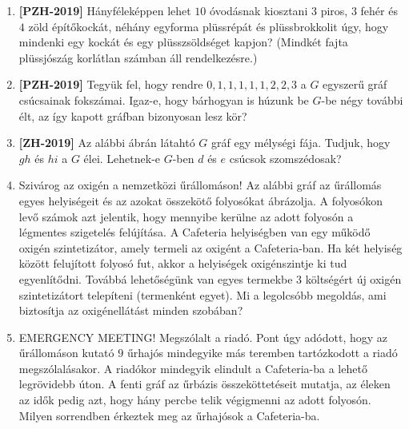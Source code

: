 \documentclass[a4paper,12pt]{article}
\begin{document}
        \noindent{}
        \noindent{}
        \begin{enumerate}

            \item \textbf{[PZH-2019]} Hányféleképpen lehet $10$ óvodásnak kiosztani $3$ piros, $3$ fehér és $4$ zöld építőkockát, néhány egyforma plüssrépát és plüssbrokkolit úgy, hogy mindenki egy kockát és egy plüsszsöldséget kapjon? (Mindkét fajta plüssjószág korlátlan számban áll rendelkezésre.)
            
            \item \textbf{[PZH-2019]} Tegyük fel, hogy rendre $0, 1, 1, 1, 1, 1, 2, 2, 3$ a $G$ egyszerű gráf csúcsainak fokszámai. Igaz-e, hogy bárhogyan is húzunk be $G$-be négy további élt, az így kapott gráfban bizonyosan lesz kör?
 
            \item \textbf{[ZH-2019]} Az alábbi ábrán látahtó $G$ gráf egy mélységi fája. Tudjuk, hogy $gh$ és $hi$ a $G$ élei. Lehetnek-e $G$-ben $d$ és $e$ csúcsok szomszédosak?
            \begin{figure}[!h]
                \centering
                
            \end{figure}

            \item Szivárog az oxigén a nemzetközi űrállomáson! Az alábbi gráf az űrállomás egyes helyiségeit és az azokat összekötő folyosókat ábrázolja. A folyosókon levő számok azt jelentik, hogy mennyibe kerülne az adott folyosón a légmentes szigetelés felújítása. A Cafeteria helyiségben van egy működő oxigén szintetizátor, amely termeli az oxigént a Cafeteria-ban. Ha két helyiség között felujított folyosó fut, akkor a helyiségek oxigénszintje ki tud egyenlítődni. Továbbá lehetőségünk van egyes termekbe $3$ költségért új oxigén szintetizátort telepíteni (termenként egyet). Mi a legolcsóbb megoldás, ami biztosítja az oxigénellátást minden szobában?
            \begin{figure}[!h]
                \centering
                
            \end{figure}
            
            \item EMERGENCY MEETING! Megszólalt a riadó. Pont úgy adódott, hogy az űrállomáson kutató $9$ űrhajós mindegyike más teremben tartózkodott a riadó megszólalásakor. A riadókor mindegyik elindult a Cafeteria-ba a lehető legrövidebb úton. A fenti gráf az űrbázis összeköttetéseit mutatja, az éleken az idők pedig azt, hogy hány percbe telik végigmenni az adott folyosón. Milyen sorrendben érkeztek meg az űrhajósok a Cafeteria-ba.
            

\end{enumerate}
\end{document}
